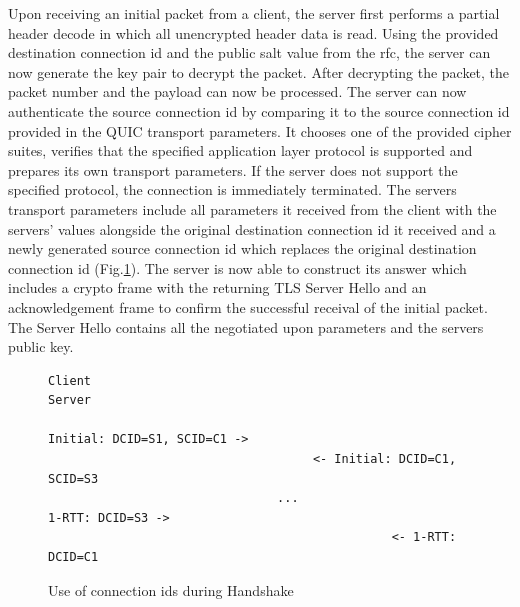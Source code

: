Upon receiving an initial packet from a client, the server first performs a partial header decode in which all unencrypted header data
is read. Using the provided destination connection id and the public salt value from the rfc, the server can now generate the key
pair to decrypt the packet. After decrypting the packet, the packet number and the payload can now be processed. The server
can now authenticate the source connection id by comparing it to
the source connection id provided in the QUIC transport parameters. It chooses one of the provided cipher suites, verifies that
the specified application layer protocol is supported and prepares its own transport parameters. If the server does not support
the specified protocol, the connection is immediately terminated.
The servers transport parameters include all parameters it received from the client with the servers' values alongside the original
destination connection id it received and a newly generated source connection id which replaces the original destination connection
id (Fig.\ref{handshake_cids}). The server is now able to construct its answer which includes a crypto frame with the returning TLS
Server Hello and an acknowledgement frame to confirm the successful receival of the initial packet. The Server Hello contains all
the negotiated upon parameters and the servers public key.

\begin{figure}[htb]
    \centering      
\begin{verbatim}
Client                                                     Server

Initial: DCID=S1, SCID=C1 ->
                                     <- Initial: DCID=C1, SCID=S3
                                ...
1-RTT: DCID=S3 ->
                                                <- 1-RTT: DCID=C1
\end{verbatim}
    \caption{Use of connection ids during Handshake\cite[38]{rfc9000}}
    \label{handshake_cids}
\end{figure}

